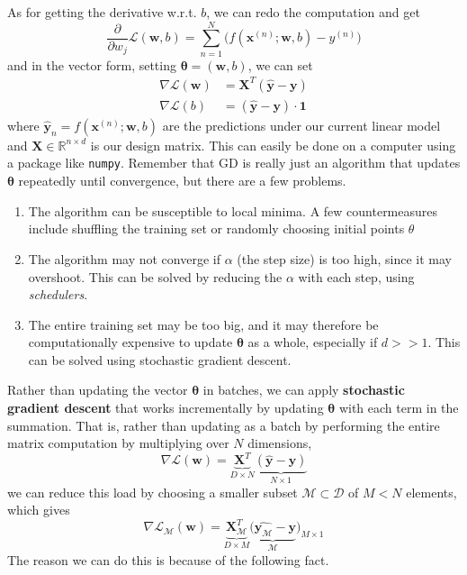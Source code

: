     As for getting the derivative w.r.t. $b$, we can redo the computation and get 
    \begin{equation}
      \frac{\partial}{\partial w_j}\mathcal{L}(\mathbf{w}, b) = \sum_{n=1}^N \big( f (\mathbf{x}^{(n)}; \mathbf{w}, b) - y^{(n)}\big) 
    \end{equation}
    and in the vector form, setting $\boldsymbol{\theta} = (\mathbf{w}, b)$, we can set 
    \begin{align}
      \nabla \mathcal{L} (\mathbf{w}) & = \mathbf{X}^T (\hat{\mathbf{y}} - \mathbf{y}) \\
      \nabla \mathcal{L} (b) & = (\hat{\mathbf{y}} - \mathbf{y}) \cdot \mathbf{1}
    \end{align}
    where $\hat{\mathbf{y}}_n = f(\mathbf{x}^{(n)}; \mathbf{w}, b)$ are the predictions under our current linear model and $\mathbf{X} \in \mathbb{R}^{n \times d}$ is our design matrix. This can easily be done on a computer using a package like \texttt{numpy}. Remember that GD is really just an algorithm that updates $\boldsymbol{\theta}$ repeatedly until convergence, but there are a few problems.
    \begin{enumerate}
      \item The algorithm can be susceptible to local minima. A few countermeasures include shuffling the training set or randomly choosing initial points $\theta$
      \item The algorithm may not converge if $\alpha$ (the step size) is too high, since it may overshoot. This can be solved by reducing the $\alpha$ with each step, using \textit{schedulers}. 
      \item The entire training set may be too big, and it may therefore be computationally expensive to update $\boldsymbol{\theta}$ as a whole, especially if $d >> 1$. This can be solved using stochastic gradient descent.
    \end{enumerate}

    Rather than updating the vector $\boldsymbol{\theta}$ in batches, we can apply \textbf{stochastic gradient descent} that works incrementally by updating $\boldsymbol{\theta}$ with each term in the summation. That is, rather than updating as a batch by performing the entire matrix computation by multiplying over $N$ dimensions,
    \begin{equation}
      \nabla \mathcal{L} (\mathbf{w}) = \underbrace{\mathbf{X}^T}_{D \times N} \underbrace{(\hat{\mathbf{y}} - \mathbf{y})}_{N \times 1}
    \end{equation}
    we can reduce this load by choosing a smaller subset $\mathcal{M} \subset \mathcal{D}$ of $M < N$ elements, which gives 
    \begin{equation}
      \nabla \mathcal{L}_{\mathcal{M}} (\mathbf{w}) = \underbrace{\mathbf{X}_{\mathcal{M}}^T}_{D \times M} \underbrace{(\hat{\mathbf{y}_{\mathcal{M}}} - \mathbf{y}}_{\mathcal{M}})_{M \times 1}
    \end{equation}
    The reason we can do this is because of the following fact.  
    
